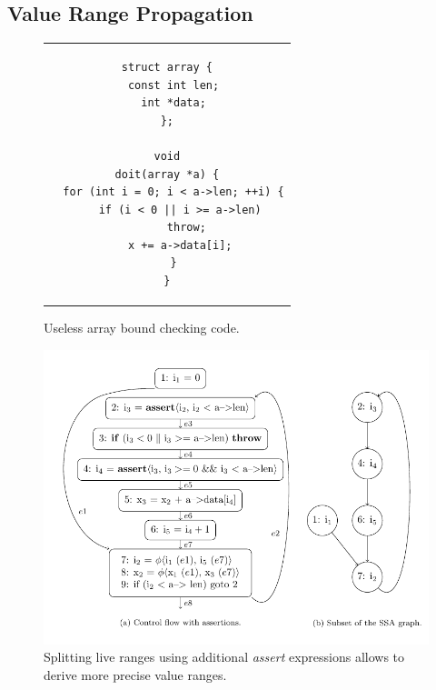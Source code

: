 \subsection{Value Range Propagation}
\label{novillo:sec:vrp}

\begin{figure}[b!]
  \begin{center}
    \begin{tabular}{c}
      \begin{lstlisting}
struct array {
  const int len;
  int *data;
};

void
doit(array *a) {
  for (int i = 0; i < a->len; ++i) {
    if (i < 0 || i >= a->len)
      throw;
    x += a->data[i];
  }
}
      \end{lstlisting}
    \end{tabular}
  \end{center}
  \caption{Useless array bound checking code.}
  \label{novillo:fig:vrp-1}
\end{figure}

\begin{figure}[t!]
  \vspace{-1em}
  \begin{center}
    \includegraphics{value_range_propagation}
  \end{center}
  \vspace{-2em}
  \caption{Splitting live ranges using additional \emph{assert} expressions
           allows to derive more precise value ranges.}
  \subfigure{\label{novillo:fig:vrp-2:a}}
  \subfigure{\label{novillo:fig:vrp-2:b}}
  \label{novillo:fig:vrp-2}
\end{figure}

